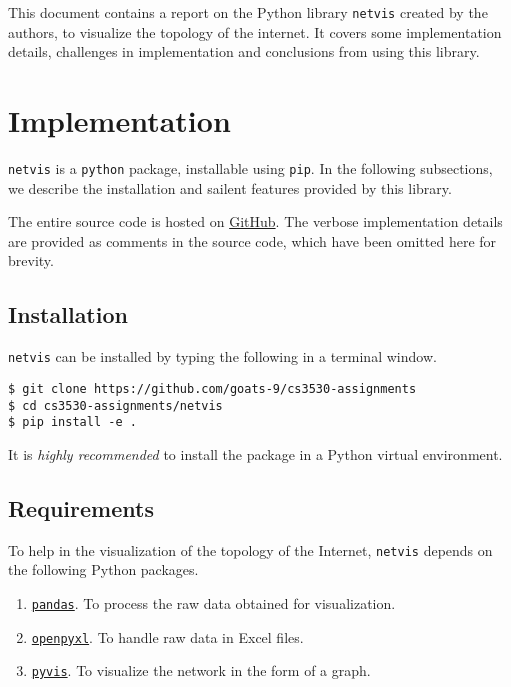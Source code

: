 \documentclass[journal,12pt,twocolumn]{IEEEtran}
\begin{document}
This document contains a report on the Python library \texttt{netvis} created by
the authors, to visualize the topology of the internet. It covers some
implementation details, challenges in implementation and conclusions from using
this library.

\section{Implementation}

\texttt{netvis} is a \texttt{python} package, installable using \texttt{pip}. In
the following subsections, we describe the installation and sailent features
provided by this library.

The entire source code is hosted on
\href{https://github.com/goats-9/cs3530-assignments/tree/main/netvis}{GitHub}.
The verbose implementation details are provided as comments in the source code,
which have been omitted here for brevity.

\subsection{Installation}

\texttt{netvis} can be installed by typing the following in a terminal window.

\begin{lstlisting}
$ git clone https://github.com/goats-9/cs3530-assignments
$ cd cs3530-assignments/netvis
$ pip install -e .
\end{lstlisting}

It is \emph{highly recommended} to install the package in a Python virtual
environment.

\subsection{Requirements}

To help in the visualization of the topology of the Internet, \texttt{netvis}
depends on the following Python packages.
\begin{enumerate}
     \item \href{https://pandas.pydata.org/}{\texttt{pandas}}. To process the
     raw data obtained for visualization.
     \item \href{https://openpyxl.readthedocs.io/en/stable/}{\texttt{openpyxl}}.
     To handle raw data in Excel files.
     \item \href{https://pyvis.readthedocs.io/en/latest/}{\texttt{pyvis}}. To
     visualize the network in the form of a graph.
\end{enumerate}
\end{document}
